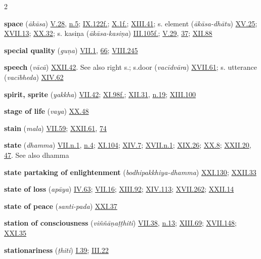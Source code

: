 \begin{multicols}{2}
\begin{vismHanging}
\par\textbf{space} (\emph{ākāsa}) \hyperlink{V.28}{V.28}{}, \hyperlink{V.n5}{n.5}{}; \hyperlink{IX.122}{IX.122f.}{}; \hyperlink{X.1}{X.1f.}{}; \hyperlink{XIII.41}{XIII.41}{}; s. element (\emph{ākāsa-dhātu}) \hyperlink{XV.25}{XV.25}{}; \hyperlink{XVII.13}{XVII.13}{}; \hyperlink{XX.32}{XX.32}{}; s. kasiṇa (\emph{ākāsa-kasiṇa}) \hyperlink{III.105}{III.105f.}{}; \hyperlink{V.29}{V.29}{}, \hyperlink{V.37}{37}{}; \hyperlink{XII.88}{XII.88}{}
\par\textbf{special quality} (\emph{guṇa}) \hyperlink{VII.1}{VII.1}{}, \hyperlink{VII.66}{66}{}; \hyperlink{VIII.245}{VIII.245}{}
\par\textbf{speech} (\emph{vācā}) \hyperlink{XXII.42}{XXII.42}{}. See also right s.; s.door (\emph{vacīdvāra}) \hyperlink{XVII.61}{XVII.61}{}; s. utterance (\emph{vacībheda}) \hyperlink{XIV.62}{XIV.62}{}
\par\textbf{spirit, sprite} (\emph{yakkha}) \hyperlink{VII.42}{VII.42}{}; \hyperlink{XI.98}{XI.98f.}{}; \hyperlink{XII.31}{XII.31}{}, \hyperlink{XII.n19}{n.19}{}; \hyperlink{XIII.100}{XIII.100}{}
\par\textbf{stage of life} (\emph{vaya}) \hyperlink{XX.48}{XX.48}{}
\par\textbf{stain} (\emph{mala}) \hyperlink{VII.59}{VII.59}{}; \hyperlink{XXII.61}{XXII.61}{}, \hyperlink{XXII.74}{74}{}
\par\textbf{state} (\emph{dhamma}) \hyperlink{VII.n1}{VII.n.1}{}, \hyperlink{VII.n4}{n.4}{}; \hyperlink{XI.104}{XI.104}{}; \hyperlink{XIV.7}{XIV.7}{}; \hyperlink{XVII.n1}{XVII.n.1}{}; \hyperlink{XIX.26}{XIX.26}{}; \hyperlink{XX.8}{XX.8}{}; \hyperlink{XXII.20}{XXII.20}{}, \hyperlink{XXII.47}{47}{}. See also dhamma 
\par\textbf{state partaking of enlightenment} (\emph{bodhipakkhiya-dhamma}) \hyperlink{XXI.130}{XXI.130}{}; \hyperlink{XXII.33}{XXII.33}{}
\par\textbf{state of loss} (\emph{apāya}) \hyperlink{IV.63}{IV.63}{}; \hyperlink{VII.16}{VII.16}{}; \hyperlink{XIII.92}{XIII.92}{}; \hyperlink{XIV.113}{XIV.113}{}; \hyperlink{XVII.262}{XVII.262}{}; \hyperlink{XXII.14}{XXII.14}{}
\par\textbf{state of peace} (\emph{santi-pada}) \hyperlink{XXI.37}{XXI.37}{}
\par\textbf{station of consciousness} (\emph{viññāṇaṭṭhiti}) \hyperlink{VII.38}{VII.38}{}, \hyperlink{VII.n13}{n.13}{}; \hyperlink{XIII.69}{XIII.69}{}; \hyperlink{XVII.148}{XVII.148}{}; \hyperlink{XXI.35}{XXI.35}{}
\par\textbf{stationariness} (\emph{ṭhiti}) \hyperlink{I.39}{I.39}{}; \hyperlink{III.22}{III.22}{}

\end{vismHanging}
\end{multicols}

